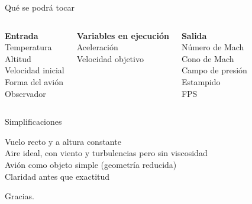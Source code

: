 \documentclass[aspectratio=169,11pt]{beamer}
\begin{document}
	\begin{frame}{Qué se podrá tocar}
		\begin{columns}[t]
			\begin{center}
				{\large\bfseries\color{ejercicio} Entrada}\\[6pt]
				Temperatura\\
				Altitud\\
				Velocidad inicial\\
				Forma del avión\\
				Observador
			\end{center}
			\begin{center}
				{\large\bfseries\color{ejercicio} Variables en ejecución}\\[6pt]
				Aceleración\\
				Velocidad objetivo
			\end{center}
			\begin{center}
				{\large\bfseries\color{ejercicio} Salida}\\[6pt]
				Número de Mach\\
				Cono de Mach\\
				Campo de presión\\
				Estampido\\
				FPS
			\end{center}
		\end{columns}
	\end{frame}
	
	\begin{frame}{Simplificaciones}
		\vspace{0.4cm}
		\begin{center}
			{\Large
				Vuelo recto y a altura constante\\[6pt]
				Aire ideal, con viento y turbulencias pero sin viscosidad\\[6pt]
				Avión como objeto simple (geometría reducida)\\[6pt]
				Claridad antes que exactitud}
		\end{center}
	\end{frame}
	
	\begin{frame}
		\vspace{1.2cm}
		\begin{center}
			{\Huge\color{ejercicio} Gracias.}
		\end{center}
	\end{frame}
	
\end{document}
